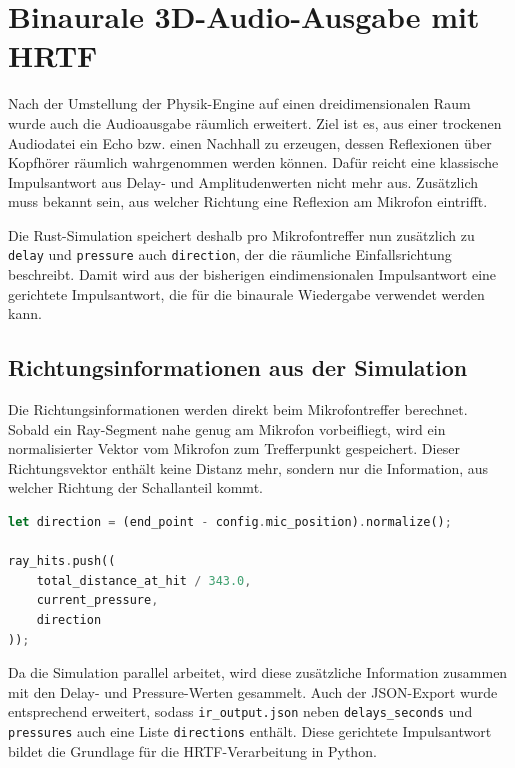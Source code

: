 \section{Binaurale 3D-Audio-Ausgabe mit HRTF}
\label{sec:binaural_3d_audio}

Nach der Umstellung der Physik-Engine auf einen dreidimensionalen Raum wurde auch die Audioausgabe räumlich erweitert. Ziel ist es, aus einer trockenen Audiodatei ein Echo bzw. einen Nachhall zu erzeugen, dessen Reflexionen über Kopfhörer räumlich wahrgenommen werden können. Dafür reicht eine klassische Impulsantwort aus Delay- und Amplitudenwerten nicht mehr aus. Zusätzlich muss bekannt sein, aus welcher Richtung eine Reflexion am Mikrofon eintrifft.

Die Rust-Simulation speichert deshalb pro Mikrofontreffer nun zusätzlich zu \texttt{delay} und \texttt{pressure} auch \texttt{direction}, der die räumliche Einfallsrichtung beschreibt. Damit wird aus der bisherigen eindimensionalen Impulsantwort eine gerichtete Impulsantwort, die für die binaurale Wiedergabe verwendet werden kann.

\subsection{Richtungsinformationen aus der Simulation}
\label{subsec:direction_information}

Die Richtungsinformationen werden direkt beim Mikrofontreffer berechnet. Sobald ein Ray-Segment nahe genug am Mikrofon vorbeifliegt, wird ein normalisierter Vektor vom Mikrofon zum Trefferpunkt gespeichert. Dieser Richtungsvektor enthält keine Distanz mehr, sondern nur die Information, aus welcher Richtung der Schallanteil kommt.

\begin{lstlisting}[language=Rust]
let direction = (end_point - config.mic_position).normalize();

ray_hits.push((
    total_distance_at_hit / 343.0,
    current_pressure,
    direction
));
\end{lstlisting}

Da die Simulation parallel arbeitet, wird diese zusätzliche Information zusammen mit den Delay- und Pressure-Werten gesammelt. Auch der JSON-Export wurde entsprechend erweitert, sodass \texttt{ir\_output.json} neben \texttt{delays\_seconds} und \texttt{pressures} auch eine Liste \texttt{directions} enthält. Diese gerichtete Impulsantwort bildet die Grundlage für die HRTF-Verarbeitung in Python.

